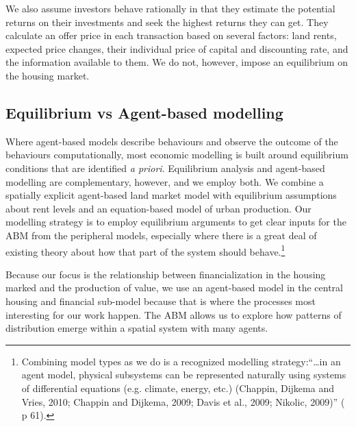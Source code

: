 


We also assume investors behave rationally in that they estimate the potential returns on their investments and seek the highest returns they can get. They calculate an offer price in each transaction based on several factors: land rents, expected price changes, their individual price of capital and discounting rate, and the information available to them. We do not, however, impose an equilibrium on the housing market.


\subsection{Equilibrium vs Agent-based modelling}
Where agent-based models describe behaviours and observe the outcome of the behaviours computationally, most economic modelling is built around equilibrium conditions that are identified \textit{a priori}. Equilibrium analysis and agent-based modelling are complementary, however, and we employ both. We combine a spatially explicit agent-based land market model with equilibrium assumptions about rent levels and an equation-based model of urban production. Our modelling strategy is to employ equilibrium arguments to get clear inputs for the \gls{ABM} from the peripheral models, especially where there is a great deal of existing theory about how that part of the system should behave.\footnote{Combining model types as we do is a recognized modelling strategy:``\dots in an agent model, physical subsystems can be represented naturally using systems of differential equations (e.g. climate, energy, etc.)  (Chappin, Dijkema and Vries, 2010; Chappin and Dijkema, 2009; Davis et al., 2009; Nikolic, 2009)''  (\cite{chappin_simulating_2011} p 61).} 

Because our focus is the relationship between financialization in the housing marked and the production of value, we use an agent-based model in the central housing and financial sub-model because that is where the processes most interesting for our work happen. The ABM allows us to explore how patterns of distribution emerge within a spatial system with many agents.

